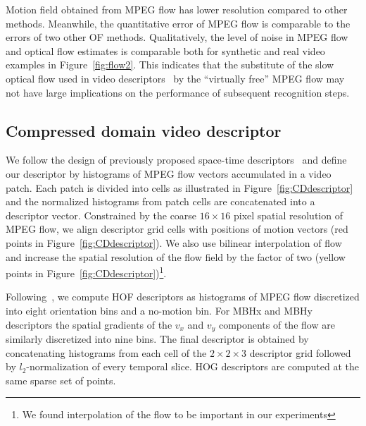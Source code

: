 \documentclass[10pt,twocolumn,letterpaper]{article}
\begin{document}
Motion field obtained from MPEG flow has lower resolution compared to other methods. 
Meanwhile, the quantitative error of MPEG flow is comparable to the errors of two other OF methods. Qualitatively, the level of noise in MPEG flow and optical flow estimates is comparable both for synthetic and real video examples in Figure~\ref{fig:flow2}. This indicates that the substitute of the slow optical flow used in video descriptors~\cite{Laptev08,Wang12} by the ``virtually free'' MPEG flow may not have large implications on the performance of subsequent recognition steps.





%
%




\subsection{Compressed domain video descriptor}
\label{sec:CDdescriptor}

We follow the design of previously proposed space-time descriptors~\cite{Laptev08,Wang12} and define our descriptor by histograms of MPEG flow vectors accumulated in a video patch. Each patch is divided into cells as illustrated in Figure~\ref{fig:CDdescriptor} and the normalized histograms from patch cells are concatenated into a descriptor vector. Constrained by the coarse $16\times16$ pixel spatial resolution of MPEG flow, we align descriptor grid cells with positions of motion vectors (red points in Figure~\ref{fig:CDdescriptor}). We also use bilinear interpolation of flow and increase the spatial resolution of the flow field by the factor of two (yellow points in Figure~\ref{fig:CDdescriptor})\footnote{We found interpolation of the flow to be important in our experiments}. 

Following~\cite{Wang12}, we compute HOF descriptors as histograms of MPEG flow discretized into eight orientation bins and a no-motion bin. For MBHx and MBHy descriptors the spatial gradients of the $v_x$ and $v_y$ components of the flow are similarly discretized into nine bins. %
The final descriptor is obtained by concatenating histograms from each cell of the $2\times2\times3$ descriptor grid followed by $l_2$-normalization of every temporal slice. HOG descriptors are computed at the same sparse set of points.
\end{document}
